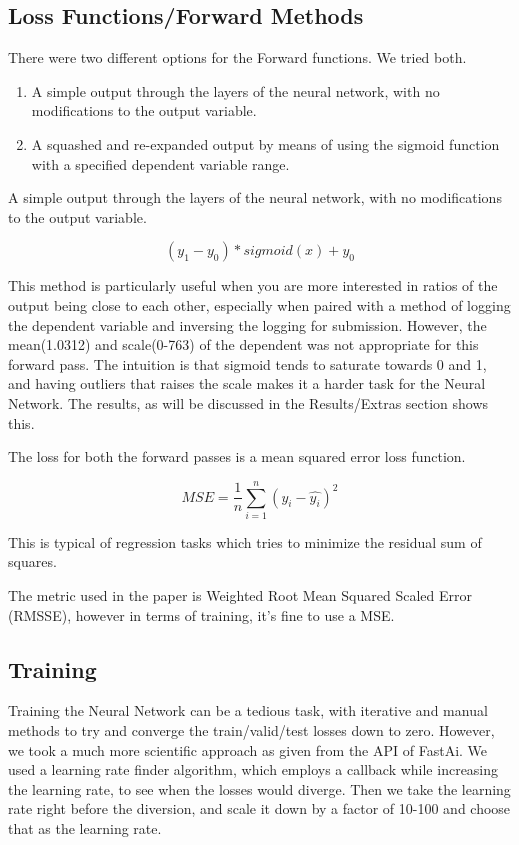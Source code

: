 \documentclass[10pt,twocolumn,letterpaper]{article}
\begin{document}
\subsection{Loss Functions/Forward Methods}
There were two different options for the Forward functions. We tried both.
\begin{enumerate}
  \item A simple output through the layers of the neural network, with no
  modifications to the output variable.
  \item A squashed and re-expanded output by means of using the sigmoid function
  with a specified dependent variable range.
\end{enumerate}
  A simple output through the layers of the neural network, with no
  modifications to the output variable.

\begin{equation}
  (y_1 - y_0) * sigmoid(x) + y_0
  \label{newEqn}
\end{equation}

  This method is particularly useful when you are more interested in ratios of
  the output being close to each other, especially when paired with a method of
  logging the dependent variable and inversing the logging for submission.
  However, the mean(1.0312) and scale(0-763) of the dependent was not
  appropriate for this forward pass. The intuition is that sigmoid tends to
  saturate towards 0 and 1, and having outliers that raises the scale makes it a
  harder task for the Neural Network. The results, as will be discussed in the
  Results/Extras section shows this.

  The loss for both the forward passes is a mean squared error loss function.

  \begin{equation}
    MSE = \frac{1}{n}\sum_{i=1}^{n} (y_i - \hat{y_i})^2
    \label{newEqn}
  \end{equation}

  This is typical of regression tasks which tries to minimize the residual sum
  of squares.

  The metric used in the paper is Weighted Root Mean Squared Scaled Error
  (RMSSE), however in terms of training, it’s fine to use a MSE.

\subsection{Training}
  Training the Neural Network can be a tedious task, with iterative and manual
  methods to try and converge the train/valid/test losses down to zero. However,
  we took a much more scientific approach as given from the API of FastAi. We
  used a learning rate finder algorithm, which employs a callback while
  increasing the learning rate, to see when the losses would diverge. Then we
  take the learning rate right before the diversion, and scale it down by a
  factor of 10-100 and choose that as the learning rate.
\end{document}
